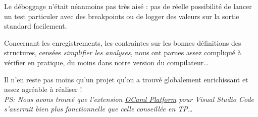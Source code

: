 \documentclass[headings=standardclasses,parskip=half]{scrartcl}
\begin{document}
Le déboggage n'était néanmoins pas très aisé : pas de réelle possibilité
de lancer un test particuler avec des breakpoints ou de logger des
valeurs sur la sortie standard facilement.

Concernant les enregistrements, les contraintes sur les bonnes
définitions des structures, censées \textit{simplifier les analyses},
nous ont parues assez compliqué à vérifier en pratique, du moins dans
notre version du compilateur\dots

Il n'en reste pas moins qu'un projet qu'on a trouvé globalement
enrichissant et assez agréable à réaliser !\\

\textit{PS: Nous avons trouvé que l'extension
    \href{https://marketplace.visualstudio.com/items?itemName=ocamllabs.ocaml-platform}{OCaml Platform}
    pour Visual Studio Code s'averrait bien plus fonctionnelle que
    celle conseillée en TP\dots}
\end{document}
